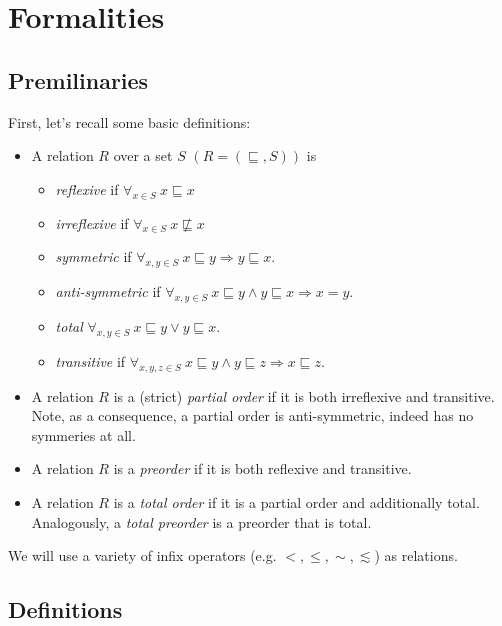 \documentclass[12pt]{article}
\def\implies{\Rightarrow}
\theoremstyle{definition}
\theoremstyle{theorem}
\begin{document}
\section{Formalities}

\subsection{Premilinaries}

First, let's recall some basic definitions:
\begin{itemize}
\item A relation $R$ over a set $S$ \(\left(R=(\sqsubseteq,S)\right)\) is
  \begin{itemize}
  \item \emph{reflexive} if \(\forall_{x\in S}\:  x \sqsubseteq x\)
  \item \emph{irreflexive} if \(\forall_{x\in S}\:  x \not\sqsubseteq x\)
  \item \emph{symmetric} if \(\forall_{x,y \in S}\: x \sqsubseteq y \implies y \sqsubseteq x \).
  \item \emph{anti-symmetric} if \(\forall_{x,y \in S}\: x \sqsubseteq y \wedge y \sqsubseteq x \implies x = y\).
    \item \emph{total} \(\forall_{x,y \in S}\: x \sqsubseteq y \vee y \sqsubseteq x\).
  \item \emph{transitive} if \( \forall_{x,y,z \in S}\: x \sqsubseteq y \wedge y \sqsubseteq z \implies x \sqsubseteq z\).
  \end{itemize}
\item A relation $R$ is a (strict) \emph{partial order} if it is both irreflexive and transitive.
  Note, as a consequence, a partial order is anti-symmetric, indeed has no symmeries at all.
  \item A relation $R$ is a \emph{preorder} if it is both reflexive and transitive.
  \item A relation $R$ is a \emph{total order} if it is a partial order and additionally total.  Analogously, a \emph{total preorder} is a preorder that is total.
\end{itemize}

We will use a variety of infix operators (e.g. \( <, \leq, \sim, \lesssim \)) as relations. 

\subsection{Definitions}

\def\SimHat#1{\stackrel{\sim}{#1}}
\def\NotSimHat#1{\stackrel{\not\sim}{#1}}
\end{document}
